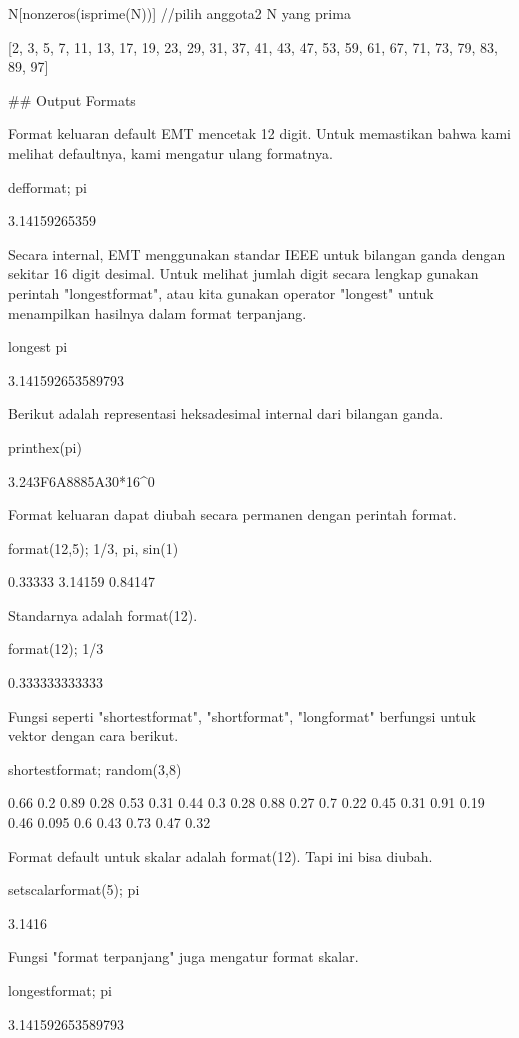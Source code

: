 \documentclass{article}
\begin{document}
\>N[nonzeros(isprime(N))] //pilih anggota2 N yang prima


    [2,  3,  5,  7,  11,  13,  17,  19,  23,  29,  31,  37,  41,  43,  47,
    53,  59,  61,  67,  71,  73,  79,  83,  89,  97]

## Output Formats

Format keluaran default EMT mencetak 12 digit. Untuk memastikan bahwa
kami melihat defaultnya, kami mengatur ulang formatnya.


\>defformat; pi


    3.14159265359

Secara internal, EMT menggunakan standar IEEE untuk bilangan ganda
dengan sekitar 16 digit desimal. Untuk melihat jumlah digit secara
lengkap gunakan perintah "longestformat", atau kita gunakan operator
"longest" untuk menampilkan hasilnya dalam format terpanjang.


\>longest pi


          3.141592653589793 

Berikut adalah representasi heksadesimal internal dari bilangan ganda.


\>printhex(pi)


    3.243F6A8885A30*16^0

Format keluaran dapat diubah secara permanen dengan perintah format.


\>format(12,5); 1/3, pi, sin(1)


        0.33333 
        3.14159 
        0.84147 

Standarnya adalah format(12).


\>format(12); 1/3


    0.333333333333

Fungsi seperti "shortestformat", "shortformat", "longformat" berfungsi
untuk vektor dengan cara berikut.


\>shortestformat; random(3,8)


      0.66    0.2   0.89   0.28   0.53   0.31   0.44    0.3 
      0.28   0.88   0.27    0.7   0.22   0.45   0.31   0.91 
      0.19   0.46  0.095    0.6   0.43   0.73   0.47   0.32 

Format default untuk skalar adalah format(12). Tapi ini bisa diubah.


\>setscalarformat(5); pi


    3.1416

Fungsi "format terpanjang" juga mengatur format skalar.


\>longestformat; pi


    3.141592653589793
\end{document}
